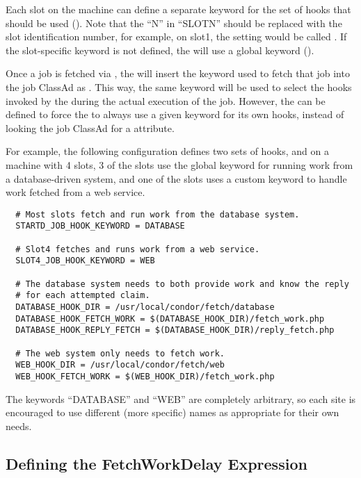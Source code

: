 Each slot on the machine can define a separate keyword for the set
of hooks that should be used (\Macro{[SLOTN\_JOB\_HOOK\_KEYWORD}).
Note that the ``N'' in ``SLOTN'' should be replaced with the slot
identification number, for example, on slot1, the setting would be
called \MacroNI{[SLOT1\_JOB\_HOOK\_KEYWORD}.
If the slot-specific keyword is not defined, the  will
use a global keyword ().

Once a job is fetched via , the
 will insert the keyword used to fetch that job into
the job ClassAd as .
This way, the same keyword will be used to select the hooks invoked by
the  during the actual execution of the job.
However, the  can be defined to
force the  to always use a given keyword for its own
hooks, instead of looking the job ClassAd for a 
attribute.

For example, the following configuration defines two sets of hooks,
and on a machine with 4 slots, 3 of the slots use the global keyword
for running work from a database-driven system, and one of the slots
uses a custom keyword to handle work fetched from a web service.
\begin{verbatim}
  # Most slots fetch and run work from the database system.
  STARTD_JOB_HOOK_KEYWORD = DATABASE

  # Slot4 fetches and runs work from a web service.
  SLOT4_JOB_HOOK_KEYWORD = WEB

  # The database system needs to both provide work and know the reply
  # for each attempted claim.
  DATABASE_HOOK_DIR = /usr/local/condor/fetch/database
  DATABASE_HOOK_FETCH_WORK = $(DATABASE_HOOK_DIR)/fetch_work.php
  DATABASE_HOOK_REPLY_FETCH = $(DATABASE_HOOK_DIR)/reply_fetch.php

  # The web system only needs to fetch work.
  WEB_HOOK_DIR = /usr/local/condor/fetch/web
  WEB_HOOK_FETCH_WORK = $(WEB_HOOK_DIR)/fetch_work.php
\end{verbatim}

The keywords ``DATABASE'' and ``WEB'' are completely arbitrary, so
each site is encouraged to use different (more specific) names as
appropriate for their own needs.


\subsection{\label{sec:job-hooks-fetch-work-delay}
Defining the FetchWorkDelay Expression}

